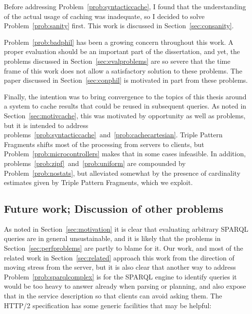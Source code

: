 Before addressing Problem~\ref{prob:syntacticcache}, I found that the
understanding of the actual usage of caching was inadequate, so I
decided to solve Problem~\ref{prob:sanity} first. This work is
discussed in Section~\ref{sec:consanity}.

Problem~\ref{prob:badphil} has been a growing concern throughout this
work. A proper evaluation should be an important part of the
dissertation, and yet, the problems discussed in
Section~\ref{sec:evalproblems} are so severe that the time frame of
this work does not allow a satisfactory solution to these
problems. The paper discussed in Section~\ref{sec:conphil} is
motivated in part from these problems.

Finally, the intention was to bring convergence to the topics of this
thesis around a system to cache results that could be reused in
subsequent queries. As noted in Section~\ref{sec:motivcache}, this was
motivated by opportunity as well as problems, but it is intended to
address
problems~\ref{prob:syntacticcache}~and~\ref{prob:cachecartesian}.
Triple Pattern Fragments shifts most of the processing from servers to
clients, but Problem~\ref{prob:microcontrollers} makes that in some
cases infeasible.  In addition,
problems~\ref{prob:zipf}~and~\ref{prob:uniform} are compounded by
Problem~\ref{prob:nostats}, but alleviated somewhat by the presence of
cardinality estimates given by Triple Pattern Fragments, which we
exploit.





\subsection{Future work; Discussion of other problems}

As noted in Section~\ref{sec:motivation} it is clear that evaluating
arbitrary SPARQL queries are in general unsustainable, and it is
likely that the problems in Section~\ref{sec:perfproblems} are partly
to blame for it. Our work, and most of the related work in
Section~\ref{sec:related} approach this work from the direction of
moving stress from the server, but it is also clear that another way
to address Problem~\ref{prob:sparqlcomplex} is for the SPARQL engine
to identify queries it would be too heavy to answer already when
parsing or planning, and also expose that in the service description
so that clients can avoid asking them. The HTTP/2 specification
\cite{rfc7540} has some generic facilities that may be helpful: 

